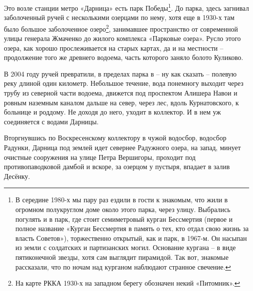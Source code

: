 Это возле станции метро «Дарница» есть парк Победы\footnote{В середине 1980-х мы пару раз ездили в гости к знакомым, что жили в огромном полукруглом доме около этого парка, через улицу. Выбрались погулять и в парк, где стоит семиметровый курган Бессмертия (первое и полное название «Курган Бессмертия в память о тех, кто отдал свою жизнь за власть Советов»), торжественно открытый, как и парк, в 1967-м. Он насыпан из земли с солдатских и партизанских могил. Основание кургана – в виде пятиконечной звезды, хотя сам выглядит пирамидой. Так вот, знакомые рассказали, что по ночам над курганом наблюдают странное свечение.}. До парка, здесь загнивал заболоченный ручей с несколькими озерцами по нему, хотя еще в 1930-х там было большое заболоченное озеро\footnote{На карте РККА 1930-х на западном берегу обозначен некий «Питомник».}, занимавшее пространство от современной улицы генерала Жмаченко до жилого комплекса «Парковые озера». Русло этого озера, как хорошо прослеживается на старых картах, да и на местности – продолжение того же древнего водоема, часть которого заняло болото Куликово.

В 2004 году ручей превратили, в пределах парка в – ну как сказать – полевую реку длиной один километр. Небольшое течение, вода понемногу выходит через трубу из северной части водоема, движется под проспектом Алишера Навои и ровным наземным каналом дальше на север, через лес, вдоль Курнатовского, к больнице и роддому. Не доходя до него, уходит в коллектор. И в нем уж соединяется с водами Дарницы.

Вторгнувшись по Воскресенскому коллектору в чужой водосбор, водосбор Радунки, Дарница под землей идет севернее Радужного озера, на запад, минует очистные сооружения на улице Петра Вершигоры, проходит под противопаводковой дамбой и вскоре, за озерцом у пустыря, впадает в залив Десёнку.


